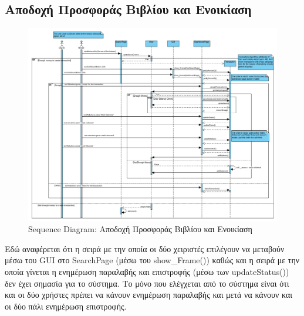 \documentclass[12pt,a4paper]{article}
\begin{document}
\subsection{Αποδοχή Προσφοράς Βιβλίου και Ενοικίαση}
\label{Rent}

\begin{figure}[H]
	\includegraphics[width=\textwidth]{Accept Book Offer and Rent Sequence.png}
	\caption{Sequence Diagram: Αποδοχή Προσφοράς Βιβλίου και Ενοικίαση}
	\label{Sequence Diagram: Αποδοχή Προσφοράς Βιβλίου και Ενοικίαση}
\end{figure}


Εδώ αναφέρεται ότι η σειρά με την οποία οι δύο χειριστές επιλέγουν να μεταβούν μέσω του GUI στο SearchPage (μέσω του show\_Frame()) καθώς και η σειρά με την οποία γίνεται η ενημέρωση παραλαβής και επιστροφής (μέσω των updateStatus()) δεν έχει σημασία για το σύστημα. Το μόνο που ελέγχεται από το σύστημα είναι ότι και οι δύο χρήστες πρέπει να κάνουν ενημέρωση παραλαβής και μετά να κάνουν και οι δύο πάλι ενημέρωση επιστροφής.
\end{document}
